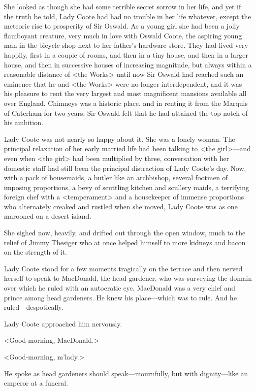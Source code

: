 She looked as though she had some terrible secret sorrow in her life, and yet if the truth be told, Lady Coote had had no trouble in her life whatever, except the meteoric rise to prosperity of Sir Oswald. As a young girl she had been a jolly flamboyant creature, very much in love with Oswald Coote, the aspiring young man in the bicycle shop next to her father's hardware store. They had lived very happily, first in a couple of rooms, and then in a tiny house, and then in a larger house, and then in successive houses of increasing magnitude, but always within a reasonable distance of <the Works> until now Sir Oswald had reached such an eminence that he and <the Works> were no longer interdependent, and it was his pleasure to rent the very largest and most magnificent mansions available all over England. Chimneys was a historic place, and in renting it from the Marquis of Caterham for two years, Sir Oswald felt that he had attained the top notch of his ambition.

Lady Coote was not nearly so happy about it. She was a lonely woman. The principal relaxation of her early married life had been talking to <the girl>—and even when <the girl> had been multiplied by three, conversation with her domestic staff had still been the principal distraction of Lady Coote's day. Now, with a pack of housemaids, a butler like an archbishop, several footmen of imposing proportions, a bevy of scuttling kitchen and scullery maids, a terrifying foreign chef with a <temperament> and a housekeeper of immense proportions who alternately creaked and rustled when she moved, Lady Coote was as one marooned on a desert island.

She sighed now, heavily, and drifted out through the open window, much to the relief of Jimmy Thesiger who at once helped himself to more kidneys and bacon on the strength of it.

Lady Coote stood for a few moments tragically on the terrace and then nerved herself to speak to MacDonald, the head gardener, who was surveying the domain over which he ruled with an autocratic eye. MacDonald was a very chief and prince among head gardeners. He knew his place—which was to rule. And he ruled—despotically.

Lady Coote approached him nervously.

<Good-morning, MacDonald.>

<Good-morning, m'lady.>

He spoke as head gardeners should speak—mournfully, but with dignity—like an emperor at a funeral.

